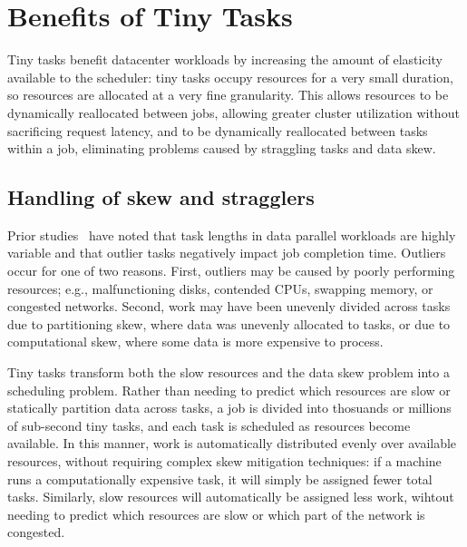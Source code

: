 \section{Benefits of Tiny Tasks}
\label{sec:benefits}

Tiny tasks benefit datacenter workloads by increasing the amount of elasticity
available to the scheduler: tiny tasks occupy resources for a very small
duration, so resources are allocated at a very fine granularity. This 
allows resources to be dynamically reallocated between jobs, allowing greater
cluster utilization without sacrificing request latency, and to be dynamically
reallocated between tasks within a job, eliminating problems caused
by straggling tasks and data skew.

\subsection{Handling of skew and stragglers}
Prior studies~\cite{ananthanarayanan2010reining,zaharia2008improving} have noted that
task lengths in data parallel workloads are highly variable and that outlier
tasks negatively impact job completion time.
Outliers occur for one of two reasons. 
First, outliers may be caused by poorly performing resources; e.g.,
malfunctioning disks, contended CPUs, swapping memory, or congested networks.
Second, work may have been unevenly
divided across tasks due to
partitioning skew, where data was unevenly allocated to tasks, or due to
computational skew, where some data is more expensive to process.

Tiny tasks transform both the slow resources and the data skew problem
into a scheduling problem.  Rather than needing to predict which resources
are slow or statically partition data across tasks, a job is divided into
thosuands or millions of sub-second tiny tasks, and each task is scheduled
as resources become available.  In this manner, work is automatically
distributed evenly over available resources, without requiring complex skew
mitigation techniques: if a machine runs a computationally expensive task, it
will simply be assigned fewer total tasks.  Similarly, slow resources will
automatically be assigned less work, wihtout needing to predict which
resources are slow or which part of the network is congested.

